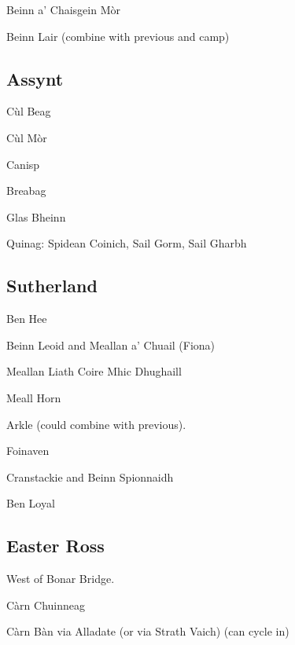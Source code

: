 Beinn a' Chaisgein Mòr

Beinn Lair (combine with previous and camp)



\subsection{Assynt}

Cùl Beag

Cùl Mòr

Canisp

Breabag


Glas Bheinn

Quinag: Spidean Coinich, Sail Gorm, Sail Gharbh


\subsection{Sutherland}

Ben Hee

Beinn Leoid and Meallan a' Chuail (Fiona)

Meallan Liath Coire Mhic Dhughaill

Meall Horn

Arkle (could combine with previous).

Foinaven

Cranstackie and Beinn Spionnaidh

Ben Loyal


\subsection{Easter Ross}

West of Bonar Bridge.

Càrn Chuinneag

Càrn Bàn via Alladate (or via Strath Vaich) (can cycle in)

